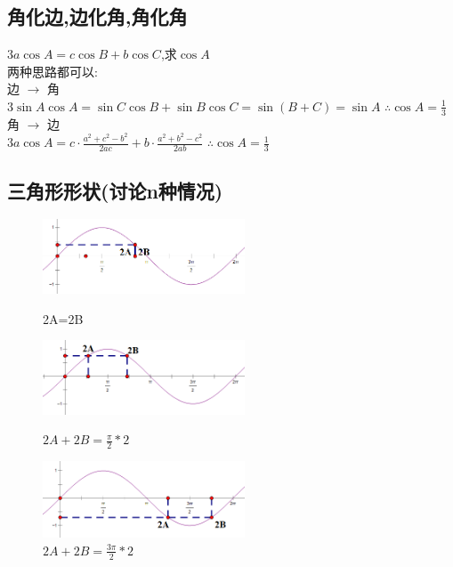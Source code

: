 \documentclass[hyperref, UTF8,11pt,a4paper]{ctexart} %
\begin{document}

\subsection{角化边,边化角,角化角}
{\color{red} $3a\cos A=c\cos B+b\cos C$,求$\cos A $} \\
两种思路都可以: \\
边 $\rightarrow$ 角 \\
$3 \sin A \cos A=\sin C \cos B+\sin B \cos C =\sin (B+C) =\sin A$
$\therefore   \cos A=\frac{1}{3}$ \\
角 $\rightarrow$ 边	 \\
$3 a \cos A=c \cdot \frac{a^{2}+c^{2}-b^{2}}{2 a c}+b \cdot \frac{a^{2}+b^{2}-c^{2}}{2 a b}$
$\therefore  \cos A=\frac{1}{3}$ \\


\subsection{三角形形状(讨论n种情况)}

\begin{figure}[htbp] %
	\centering
	\begin{minipage}{170pt}
		\centering
		\includegraphics[width=170pt]  {pic/zhengyuxian/2A=2B.png}
		\caption{2A=2B}
	\end{minipage}
	\hspace{10pt}
	\begin{minipage}{170pt}
		\centering
		\includegraphics[width=170pt]  {pic/zhengyuxian/2A=2B1.png}
		\caption{$ 2A+2B= \frac{\pi}{2} * 2 $}
	\end{minipage}
	\hspace{10pt}
	\begin{minipage}{170pt}
		\centering
		\includegraphics[width=170pt]  {pic/zhengyuxian/2A=2B2.png}
		\caption{$ 2A+2B= \frac{3\pi}{2} * 2 $}
	\end{minipage}
\end{figure}
\end{document}
